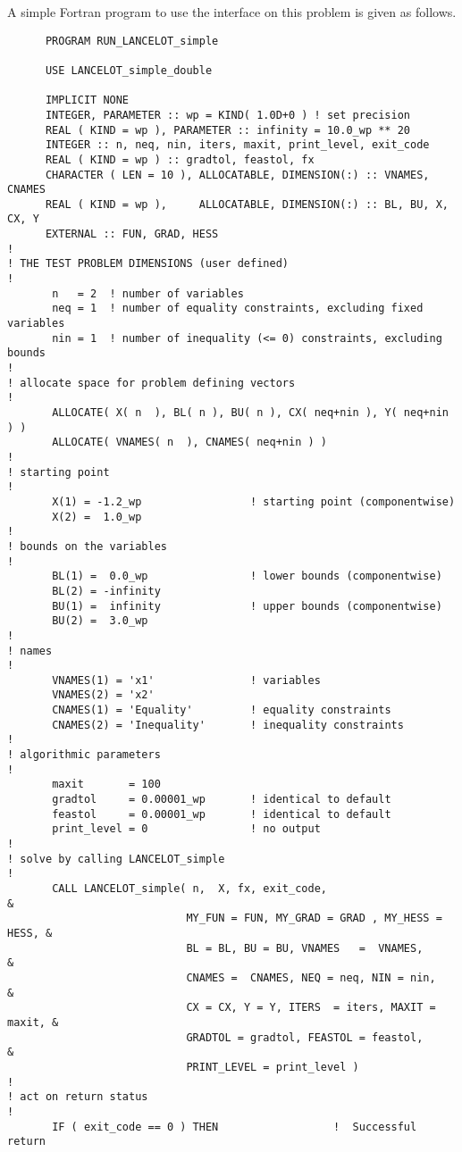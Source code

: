 \documentclass{galahad}
\begin{document}
\noindent
A simple Fortran program to use the interface on this problem is given as
follows.

\def\baselinestretch{0.8}{\tt \begin{verbatim}
      PROGRAM RUN_LANCELOT_simple

      USE LANCELOT_simple_double

      IMPLICIT NONE
      INTEGER, PARAMETER :: wp = KIND( 1.0D+0 ) ! set precision
      REAL ( KIND = wp ), PARAMETER :: infinity = 10.0_wp ** 20
      INTEGER :: n, neq, nin, iters, maxit, print_level, exit_code
      REAL ( KIND = wp ) :: gradtol, feastol, fx
      CHARACTER ( LEN = 10 ), ALLOCATABLE, DIMENSION(:) :: VNAMES, CNAMES
      REAL ( KIND = wp ),     ALLOCATABLE, DIMENSION(:) :: BL, BU, X, CX, Y
      EXTERNAL :: FUN, GRAD, HESS
!
! THE TEST PROBLEM DIMENSIONS (user defined)
!
       n   = 2  ! number of variables
       neq = 1  ! number of equality constraints, excluding fixed variables
       nin = 1  ! number of inequality (<= 0) constraints, excluding bounds
!
! allocate space for problem defining vectors
!
       ALLOCATE( X( n  ), BL( n ), BU( n ), CX( neq+nin ), Y( neq+nin ) )
       ALLOCATE( VNAMES( n  ), CNAMES( neq+nin ) )
!
! starting point
!
       X(1) = -1.2_wp                 ! starting point (componentwise)
       X(2) =  1.0_wp
!
! bounds on the variables
!
       BL(1) =  0.0_wp                ! lower bounds (componentwise)
       BL(2) = -infinity
       BU(1) =  infinity              ! upper bounds (componentwise)
       BU(2) =  3.0_wp
!
! names
!
       VNAMES(1) = 'x1'               ! variables
       VNAMES(2) = 'x2'
       CNAMES(1) = 'Equality'         ! equality constraints
       CNAMES(2) = 'Inequality'       ! inequality constraints
!
! algorithmic parameters
!
       maxit       = 100
       gradtol     = 0.00001_wp       ! identical to default
       feastol     = 0.00001_wp       ! identical to default
       print_level = 0                ! no output
!
! solve by calling LANCELOT_simple
!
       CALL LANCELOT_simple( n,  X, fx, exit_code,                         &
                            MY_FUN = FUN, MY_GRAD = GRAD , MY_HESS = HESS, &
                            BL = BL, BU = BU, VNAMES   =  VNAMES,          &
                            CNAMES =  CNAMES, NEQ = neq, NIN = nin,        &
                            CX = CX, Y = Y, ITERS  = iters, MAXIT = maxit, &
                            GRADTOL = gradtol, FEASTOL = feastol,          &
                            PRINT_LEVEL = print_level )
!
! act on return status
!
       IF ( exit_code == 0 ) THEN                  !  Successful return

\end{verbatim}}
\end{document}

